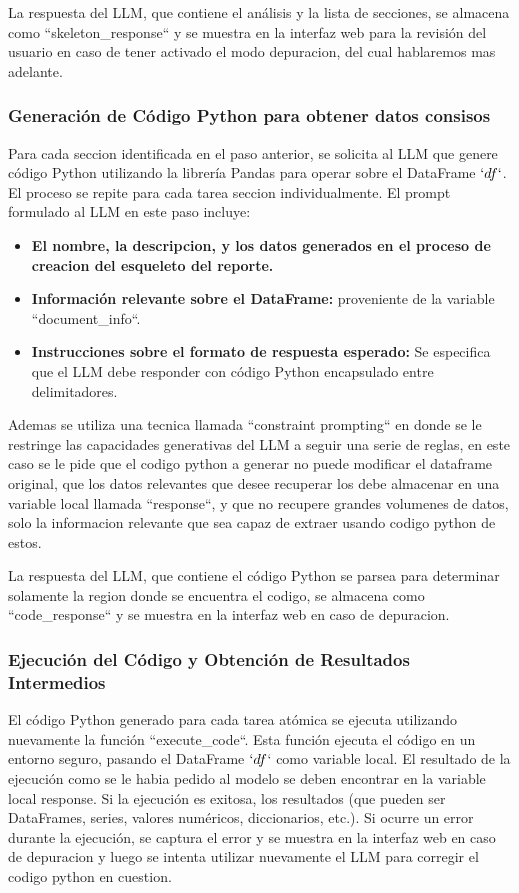 La respuesta del LLM, que contiene el análisis y la lista de secciones,  se almacena como ``skeleton\_response`` y se muestra en la interfaz web para la revisión del usuario en caso de tener activado el modo depuracion, del cual hablaremos mas adelante.

\subsubsection{Generación de Código Python para obtener datos consisos}

Para cada seccion identificada en el paso anterior, se solicita al LLM que genere código Python utilizando la librería Pandas para operar sobre el DataFrame $`df`$.  El proceso se repite para cada tarea seccion individualmente.  El prompt formulado al LLM en este paso incluye:

\begin{itemize}
	\item \textbf{El nombre, la descripcion, y los datos generados en el proceso de creacion del esqueleto del reporte.}
	\item \textbf{Información relevante sobre el DataFrame:} proveniente de la variable  ``document\_info``.
	\item \textbf{Instrucciones sobre el formato de respuesta esperado:} Se especifica que el LLM debe responder con código Python encapsulado entre delimitadores.
\end{itemize}
Ademas se utiliza una tecnica llamada ``constraint prompting`` en donde se le restringe las capacidades generativas del LLM a seguir una serie de reglas, en este caso se le pide que el codigo python a generar no puede modificar el dataframe original, que los datos relevantes que desee recuperar los debe almacenar en una variable local llamada ``response``, y que no recupere grandes volumenes de datos, solo la informacion relevante que sea capaz de extraer usando codigo python de estos.

La respuesta del LLM, que contiene el código Python se parsea para determinar solamente la region donde se encuentra el codigo, se almacena como ``code\_response`` y se muestra en la interfaz web en caso de depuracion.

\subsubsection{Ejecución del Código y Obtención de Resultados Intermedios}

El código Python generado para cada tarea atómica se ejecuta utilizando nuevamente la función ``execute\_code``.  Esta función ejecuta el código en un entorno seguro,  pasando el DataFrame $`df$` como variable local.  El resultado de la ejecución como se le habia pedido al modelo se deben encontrar en la variable local response. Si la ejecución es exitosa,  los resultados (que pueden ser DataFrames, series, valores numéricos, diccionarios, etc.).  Si ocurre un error durante la ejecución,  se captura el error y se muestra en la interfaz web en caso de depuracion y  luego se intenta utilizar nuevamente el LLM para corregir el codigo python en cuestion.

